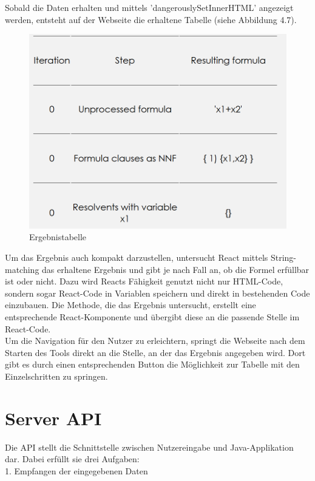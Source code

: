 Sobald die Daten erhalten und mittels 'dangerouslySetInnerHTML' angezeigt werden, entsteht auf der Webseite die erhaltene Tabelle (siehe Abbildung 4.7).\\
\begin{figure}[H]
     \centerline{\includegraphics[width=14cm]{../Abbildungen/steps.png}}
  \caption{Ergebnistabelle \cite{eig}}
  \label{fig1_1}
\end{figure}
\noindent Um das Ergebnis auch kompakt darzustellen, untersucht React mittels String-matching das erhaltene Ergebnis und gibt je nach Fall an, ob die Formel erfüllbar ist oder nicht. Dazu wird Reacts Fähigkeit genutzt nicht nur HTML-Code, sondern sogar React-Code in Variablen speichern und direkt in bestehenden Code einzubauen. Die Methode, die das Ergebnis untersucht, erstellt eine entsprechende React-Komponente und übergibt diese an die passende Stelle im React-Code. \\
Um die Navigation für den Nutzer zu erleichtern, springt die Webseite nach dem Starten des Tools direkt an die Stelle, an der das Ergebnis angegeben wird. Dort gibt es durch einen entsprechenden Button die Möglichkeit zur Tabelle mit den Einzelschritten zu springen.
\clearpage
\section{Server API}
Die API stellt die Schnittstelle zwischen Nutzereingabe und Java-Applikation dar. Dabei erfüllt sie drei Aufgaben: \\

1. Empfangen der eingegebenen Daten \\ 

